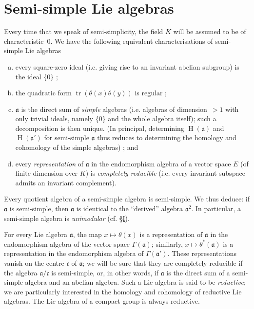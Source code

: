 \documentclass{article}
\newcommand{\fk}{\mathfrak}
\DeclareMathOperator{\HH}{H}
\DeclareMathOperator{\tr}{tr}
\newcommand{\oldpage}[1]{\marginpar{\footnotesize$\Big\vert$ \textit{p.~#1}}}
\begin{document}
\section{Semi-simple Lie algebras}
\label{II.3}

Every time that we speak of semi-simplicity, the field $K$ will be assumed to be of characteristic~$0$.
We have the following equivalent characterisations of semi-simple Lie algebras
\begin{enumerate}[(a)]
  \item every square-zero ideal (i.e. giving rise to an invariant abelian subgroup) is the ideal $\{0\}$ ;
  \item the quadratic form $\tr(\theta(x)\theta(y))$ is regular ;
  \item $\fk{a}$ is the direct sum of \emph{simple} algebras (i.e. algebras of dimension~$>1$ with only trivial ideals, namely $\{0\}$ and the whole algebra itself);
    such a decomposition is then unique.
    (In principal, determining $\HH(\fk{a})$ and $\HH(\fk{a}')$ for semi-simple $\fk{a}$ thus reduces to determining the homology and cohomology of the simple algebras) ; and
\oldpage{47}
  \item every \emph{representation} of $\fk{a}$ in the endomorphism algebra of a vector space $E$ (of finite dimension over $K$) is \emph{completely reducible} (i.e. every invariant subspace admits an invariant complement).
\end{enumerate}

Every quotient algebra of a semi-simple algebra is semi-simple.
We thus deduce:
if $\fk{a}$ is semi-simple, then $\fk{a}$ is identical to the ``derived'' algebra $\fk{a}^2$.
In particular, a semi-simple algebra is \emph{unimodular} (cf. \hyperref[I]{\S I}).

For every Lie algebra $\fk{a}$, the map $x\mapsto\theta(x)$ is a representation of $\fk{a}$ in the endomorphism algebra of the vector space $\Gamma(\fk{a})$;
similarly, $x\mapsto\theta^*(\fk{a})$ is a representation in the endomorphism algebra of $\Gamma(\fk{a}')$.
These representations vanish on the centre $\fk{c}$ of $\fk{a}$;
we will be sure that they are completely reducible if the algebra $\fk{a}/\fk{c}$ is semi-simple, or, in other words, if $\fk{a}$ is the direct sum of a semi-simple algebra and an abelian algebra.
Such a Lie algebra is said to be \emph{reductive};
we are particularly interested in the homology and cohomology of reductive Lie algebras.
The Lie algebra of a compact group is always reductive.
\end{document}
